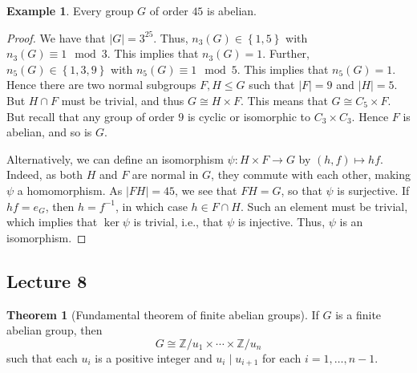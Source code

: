 \documentclass[10pt,letterpaper,cm]{nupset}
\theoremstyle{definition}
\newtheorem{exmp}[definition]{Example}
\theoremstyle{theorem}
\newtheorem{theorem}[definition]{Theorem}
\theoremstyle{remark}
\newcommand{\Z}{\mathbb Z}
\newcommand{\1}{\mathbf{1}}
\newcommand{\0}{\vec 0}
\begin{document}
\begin{exmp}
Every group $G$ of order $45$ is abelian.
\end{exmp}
\begin{proof}
We have that $\left\lvert{G}\right\rvert = 3^25$.  Thus, $n_3(G) \in \left\{1, 5\right\}$ with $n_3(G) \equiv 1\mod 3$. This implies that $n_3(G) = 1$. Further, $n_5(G) \in \left\{1, 3, 9\right\}$ with $n_5(G) \equiv 1 \mod 5$. This implies that $n_5(G) =1$. Hence there are two normal subgroups $F, H\leq G$ such that $\left\lvert{F}\right\rvert =9$ and $\left\lvert{H}\right\rvert =5$. But $H \cap F$ must be trivial, and thus $G\cong H \times F$. This means that $G \cong C_5 \times F$. But recall that any group of order $9$ is cyclic or isomorphic to $C_3 \times C_3$. Hence $F$ is abelian, and so is $G$. 

Alternatively, we can define an isomorphism $\psi: H \times F \to G$ by $\left(h,f\right) \mapsto hf$. Indeed, as both $H$ and $F$ are normal in $G$, they commute with each other, making $\psi$ a homomorphism. As $\left\lvert{FH}\right\rvert = 45$, we see that $FH=G$, so that $\psi$ is surjective. If $hf =e_G$, then $h= f^{-1}$, in which case $h\in F \cap H$. Such an element must be trivial, which implies that $\ker{\psi}$ is trivial, i.e., that $\psi$ is injective. Thus, $\psi$ is an isomorphism.
\end{proof}

\subsection{Lecture 8}

\begin{theorem}[Fundamental theorem of finite abelian groups]\label{FTFAG}
If $G$ is a finite abelian group, then $$ G \cong \Z/u_1 \times \cdots \times \Z/u_n$$ such that each $u_i$ is a positive integer and $u_i \mid u_{i+1}$ for each $i=1, \ldots, n-1$.
\end{theorem}
\end{document}
